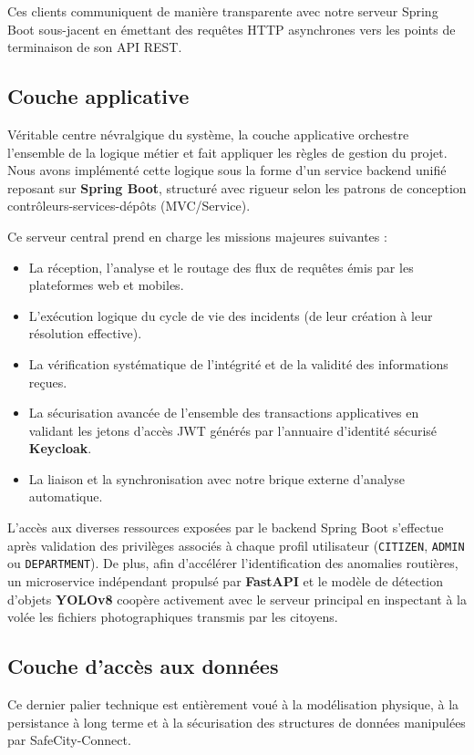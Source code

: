 Ces clients communiquent de manière transparente avec notre serveur Spring Boot sous-jacent en émettant des requêtes HTTP asynchrones vers les points de terminaison de son API REST.

\subsection{Couche applicative}
Véritable centre névralgique du système, la couche applicative orchestre l'ensemble de la logique métier et fait appliquer les règles de gestion du projet. Nous avons implémenté cette logique sous la forme d'un service backend unifié reposant sur \textbf{Spring Boot}, structuré avec rigueur selon les patrons de conception contrôleurs-services-dépôts (MVC/Service).

Ce serveur central prend en charge les missions majeures suivantes :
\begin{itemize}
    \item La réception, l'analyse et le routage des flux de requêtes émis par les plateformes web et mobiles.
    \item L'exécution logique du cycle de vie des incidents (de leur création à leur résolution effective).
    \item La vérification systématique de l'intégrité et de la validité des informations reçues.
    \item La sécurisation avancée de l'ensemble des transactions applicatives en validant les jetons d'accès JWT générés par l'annuaire d'identité sécurisé \textbf{Keycloak}.
    \item La liaison et la synchronisation avec notre brique externe d'analyse automatique.
\end{itemize}

L'accès aux diverses ressources exposées par le backend Spring Boot s'effectue après validation des privilèges associés à chaque profil utilisateur (\texttt{CITIZEN}, \texttt{ADMIN} ou \texttt{DEPARTMENT}). De plus, afin d'accélérer l'identification des anomalies routières, un microservice indépendant propulsé par \textbf{FastAPI} et le modèle de détection d'objets \textbf{YOLOv8} coopère activement avec le serveur principal en inspectant à la volée les fichiers photographiques transmis par les citoyens.

\subsection{Couche d'accès aux données}
Ce dernier palier technique est entièrement voué à la modélisation physique, à la persistance à long terme et à la sécurisation des structures de données manipulées par SafeCity-Connect.

